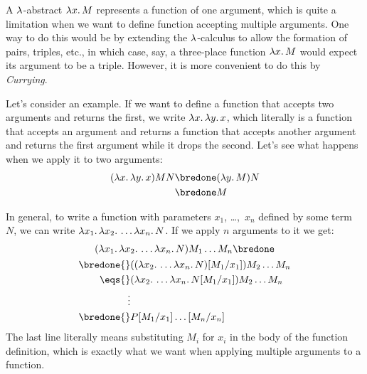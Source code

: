 \documentclass[../../../include/open-logic-section]{subfiles}
\begin{document}

A $\lambd$-abstract $\lambd[x][M]$ represents a function of one argument,
which is quite a limitation when we want to define function accepting
multiple arguments.  One way to do this would be by extending the
$\lambd$-calculus to allow the formation of pairs, triples, etc., in
which case, say, a three-place function $\lambd[x][M]$ would expect
its argument to be a triple.  However, it is more convenient to do
this by \emph{Currying}.

Let's consider an example. If we want to define a function that
accepts two arguments and returns the first, we write
$\lambd[x][\lambd[y][x]]$, which literally is a function that accepts
an argument and returns a function that accepts another argument and
returns the first argument while it drops the second. Let's see what
happens when we apply it to two arguments:
\begin{align*}
  (\lambd[x][\lambd[y][x]])MN 
  \bredone & (\lambd[y][M])N \\
  \bredone & M
\end{align*}

In general, to write a function with parameters $x_1$, \dots,~$x_n$
defined by some term~$N$, we can write
$\lambd[x_1][\lambd[x_2][\ldots\lambd[x_n][N]]]$. If we apply $n$ arguments
to it we get:
\begin{multline*}
  (\lambd[x_1][\lambd[x_2][\ldots\lambd[x_n][N]]]) M_1 \dots M_n \bredone\\
  \begin{aligned}
  \bredone {} & (\Subst{(\lambd[x_2][\ldots\lambd[x_n][N]])}{M_1}{x_1}) M_2
  \dots M_n\\
   \eqs {} & (\lambd[x_2][\ldots\lambd[x_n][\Subst{N}{M_1}{x_1}]]) M_2
            \dots M_n \\
  \vdots & \\
  \bredone {} &\Subst{\Subst{P}{M_1}{x_1}\ldots}{M_n}{x_n}
  \end{aligned}
\end{multline*}
The last line literally means substituting $M_i$ for $x_i$ in the body
of the function definition, which is exactly what we want when
applying multiple arguments to a function.
\end{document}
